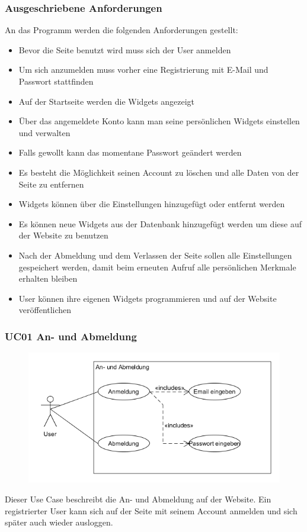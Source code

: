 		\subsubsection{Ausgeschriebene Anforderungen}
			An das Programm werden die folgenden Anforderungen gestellt: 
			\begin{itemize}
				\item Bevor die Seite benutzt wird muss sich der User anmelden 
				\item Um sich anzumelden muss vorher eine Registrierung mit E-Mail und Passwort stattfinden  
				\item Auf der Startseite werden die Widgets angezeigt
				\item Über das angemeldete Konto kann man seine persönlichen Widgets einstellen und verwalten
				\item Falls gewollt kann das momentane Passwort geändert werden
				\item Es besteht die Möglichkeit seinen Account zu löschen und alle Daten von der Seite zu entfernen 
				\item Widgets können über die Einstellungen hinzugefügt oder entfernt werden
				\item Es können neue Widgets aus der Datenbank hinzugefügt werden um diese auf der Website zu benutzen 
				\item Nach der Abmeldung und dem Verlassen der Seite sollen alle Einstellungen gespeichert werden, damit beim erneuten Aufruf alle persönlichen Merkmale erhalten bleiben   
				\item User können ihre eigenen Widgets programmieren und auf der Website veröffentlichen    
			\end{itemize}
		
		\subsubsection{UC01 An- und Abmeldung}
			\begin{figure}[H]
				\includegraphics[scale=0.8]{images/AnAbmeldung}
			\end{figure}
			Dieser Use Case beschreibt die An- und Abmeldung auf der Website. Ein registrierter User kann sich auf der Seite mit seinem Account anmelden und sich später auch wieder ausloggen. 
		

